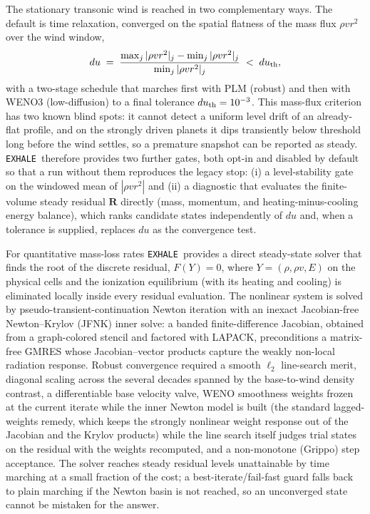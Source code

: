 \documentclass[twocolumn]{aastex702}
\newcommand{\EXHALE}{\texttt{EXHALE}}
\begin{document}
The stationary transonic wind is reached in two complementary ways. The default is time
relaxation, converged on the spatial flatness of the mass flux
$\rho v r^2$ over the wind window,
\begin{equation}
du \;=\; \frac{\max_j |\rho v r^2|_j - \min_j |\rho v r^2|_j}
              {\min_j |\rho v r^2|_j} \;<\; du_{\rm th},
\end{equation}
with a two-stage schedule that marches first with PLM (robust) and then with WENO3
(low-diffusion) to a final tolerance $du_{\rm th}=10^{-3}$. This mass-flux criterion has
two known blind spots: it cannot detect a uniform level drift of an already-flat profile,
and on the strongly driven planets it dips transiently below threshold long before the
wind settles, so a premature snapshot can be reported as steady. \EXHALE\ therefore
provides two further gates, both opt-in and disabled by default so that a run without them
reproduces the legacy stop: (i) a level-stability gate on the windowed mean of
$|\rho v r^2|$ and (ii) a diagnostic that evaluates the finite-volume steady residual
$\mathbf{R}$ directly (mass, momentum, and heating-minus-cooling energy balance), which
ranks candidate states independently of $du$ and, when a tolerance is supplied, replaces
$du$ as the convergence test.

For quantitative mass-loss rates \EXHALE\ provides a direct steady-state solver that
finds the root of the discrete residual, $F(Y)=0$, where $Y=(\rho,\rho v,E)$ on the
physical cells and the ionization equilibrium (with its heating and cooling) is
eliminated locally inside every residual evaluation. The nonlinear system is solved by
pseudo-transient-continuation Newton iteration with an inexact Jacobian-free
Newton--Krylov (JFNK) inner solve: a banded finite-difference Jacobian, obtained from a
graph-colored stencil and factored with LAPACK, preconditions a matrix-free GMRES whose
Jacobian--vector products capture the weakly non-local radiation response. Robust
convergence required a smooth $\ell_2$ line-search merit, diagonal scaling across the
several decades spanned by the base-to-wind density contrast, a differentiable base
velocity valve, WENO smoothness weights frozen at the current iterate while the inner
Newton model is built (the standard lagged-weights remedy, which keeps the strongly
nonlinear weight response out of the Jacobian and the Krylov products) while the line
search itself judges trial states on the residual with the weights recomputed, and a
non-monotone (Grippo) step acceptance. The solver reaches steady
residual levels unattainable by time marching at a small fraction of the cost; a
best-iterate/fail-fast guard falls back to plain marching if the Newton basin is not
reached, so an unconverged state cannot be mistaken for the answer.
\end{document}
